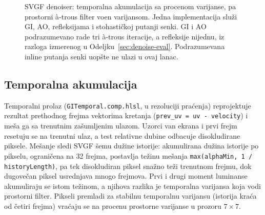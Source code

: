 \begin{figure}[tbp]
\centering
{}
\caption[Zajedni\v{c}ki SVGF denoiser]{SVGF denoiser: temporalna akumulacija sa procenom varijanse, pa prostorni \`a-trous filter vo\dj{}en varijansom. Jedna implementacija slu\v{z}i GI, AO, refleksijama i stohasti\v{c}koj putanji senki. GI i AO podrazumevano rade tri \`a-trous iteracije, a refleksije nijednu, iz razloga izmerenog u Odeljku~\ref{sec:denoise-eval}. Podrazumevana inline putanja senki uop\v{s}te ne ulazi u ovaj lanac.}
\label{fig:svgf}
\end{figure}

\subsection{Temporalna akumulacija}

Temporalni prolaz (\texttt{GITemporal.comp.hlsl}, u rezoluciji pra\'cenja) reprojektuje rezultat prethodnog frejma vektorima kretanja (\texttt{prev_uv = uv - velocity}) i me\v{s}a ga sa trenutnim za\v{s}umljenim ulazom. Uzorci van ekrana i prvi frejm resetuju se na trenutni ulaz, a test relativne dubine odbacuje disokludirane piksele. Me\v{s}anje sledi SVGF \v{s}emu du\v{z}ine istorije: akumulirana du\v{z}ina istorije po pikselu, ograni\v{c}ena na 32 frejma, postavlja te\v{z}inu me\v{s}anja \texttt{max(alphaMin, 1 / historyLength)}, pa tek disokludiran piksel sna\v{z}no te\v{z}i trenutnom frejmu, dok dugove\v{c}an piksel usrednjava mnogo frejmova. Prvi i drugi moment luminanse akumuliraju se istom te\v{z}inom, a njihova razlika je temporalna varijansa koja vodi prostorni filter. Pikseli premladi za stabilnu temporalnu varijansu (istorija kra\'ca od \v{c}etiri frejma) vra\'caju se na procenu prostorne varijanse u prozoru $7\times7$.

